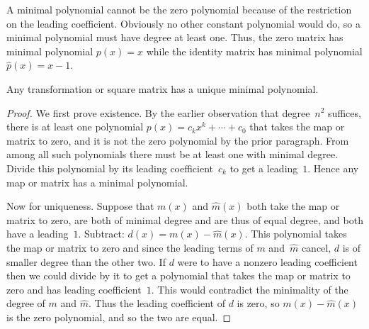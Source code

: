 \noindent A minimal
polynomial cannot be the zero polynomial because 
of the restriction on the leading coefficient.
Obviously no other constant polynomial would do, so a minimal
polynomial must have degree at least one.
Thus, the zero matrix has minimal polynomial $p(x)=x$ while the 
identity matrix has minimal polynomial $\hat{p}(x)=x-1$.

\begin{lemma}
Any transformation or square matrix has a unique minimal polynomial.  
\end{lemma}

\begin{proof}
We first prove existence.
By the earlier observation 
that degree~$n^2$ suffices, there is at least one 
polynomial $p(x)=c_kx^k+\cdots+c_0$ that
takes the map or matrix to zero, and 
it is not the zero polynomial by the prior paragraph.
From among all such polynomials
there must be at least one with minimal degree.
Divide this polynomial by its leading coefficient~$c_k$ to get a leading~$1$.
Hence any map or matrix has a minimal polynomial.

Now for uniqueness.
Suppose that 
\( m(x) \) and \( \hat{m}(x) \) both take the map or matrix to zero,
are both of 
minimal degree and are thus of equal degree, 
and both have a leading~$1$.
Subtract: \( d(x)=m(x)-\hat{m}(x) \).
This polynomial takes the map or matrix to zero
and since the leading terms of $m$ and~$\hat{m}$ cancel,
$d$ is of smaller degree than the other two.
If $d$ were to have a nonzero leading coefficient then we could divide
by it to get a polynomial that takes the map or matrix to zero and
has leading coefficient~$1$.
This would contradict the minimality of the degree
of $m$ and $\hat{m}$. 
Thus the leading coefficient of $d$ is zero,
so \( m(x)-\hat{m}(x) \) is the zero polynomial, 
and so the two are equal.
\end{proof}

